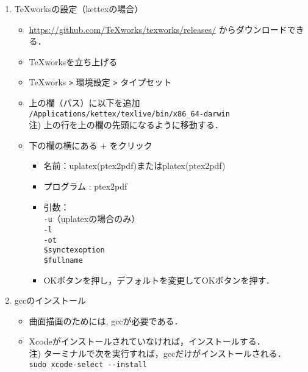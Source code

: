 \documentclass{ujarticle}
\begin{document}
\begin{enumerate}[\bf\large 1.]
\item TeXworksの設定（kettexの場合）
  \begin{itemize}
  \item \url{https://github.com/TeXworks/texworks/releases/} からダウンロードできる．
  \item TeXworksを立ち上げる
  \item TeXworks \verb|>| 環境設定 \verb|>| タイプセット
  \item 上の欄（パス）に以下を追加\\
  \hspace*{5mm}\verb|/Applications/kettex/texlive/bin/x86_64-darwin|\\
  \hspace*{10mm}注) 上の行を上の欄の先頭になるように移動する．
  \item 下の欄の横にある + をクリック
    \begin{itemize}
    \item 名前：uplatex(ptex2pdf)またはplatex(ptex2pdf)
    \item プログラム : ptex2pdf
    \item 引数：\\
    \hspace*{10mm} \verb|-u|（uplatexの場合のみ）\\
    \hspace*{10mm} \verb|-l|\\
    \hspace*{10mm} \verb|-ot|\\
    \hspace*{10mm}  \verb|$synctexoption|\\
    \hspace*{10mm}  \verb|$fullname|
    \item[]OKボタンを押し，デフォルトを変更してOKボタンを押す．
    \end{itemize}
  \end{itemize}
\item gccのインストール
  \begin{itemize}
    \item 曲面描画のためには, gccが必要である．
    \item Xcodeがインストールされていなければ，インストールする．\\
    \hspace*{5mm}注) ターミナルで次を実行すれば，gccだけがインストールされる．\\
    \hspace*{20mm}\verb|sudo xcode-select --install|
  \end{itemize}


\end{enumerate}
\end{document}
